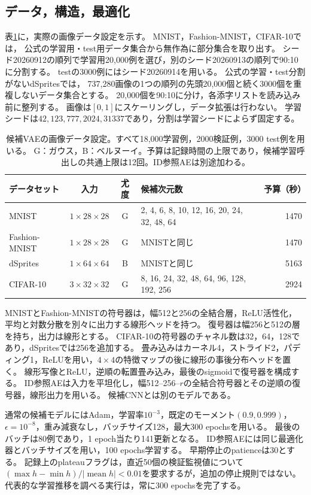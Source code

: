 \documentclass[11pt,a4paper]{ltjsarticle}
\begin{document}
\subsection{データ，構造，最適化}
表\ref{tab:data}に，実際の画像データ設定を示す。
MNIST\cite{lecun1998}，Fashion-MNIST\cite{xiao2017fashion}，CIFAR-10\cite{krizhevsky2009learning}では，
公式の学習用・test用データ集合から無作為に部分集合を取り出す。
シード20260912の順列で学習用20,000例を選び，別のシード20260913の順列で90:10に分割する。
testの3000例にはシード20260914を用いる。
公式の学習・test分割がないdSprites\cite{matthey2017dsprites}では，
737,280画像の1つの順列の先頭20,000個と続く3000個を重複しないデータ集合とする。
20,000個を90:10に分け，各添字リストを読み込み前に整列する。
画像は$[0,1]$にスケーリングし，データ拡張は行わない。
学習シードは$42,123,777,2024,31337$であり，分割は学習シードによらず固定する。

\begin{table}[H]
\caption{候補VAEの画像データ設定。すべて18,000学習例，2000検証例，3000 test例を用いる。
G：ガウス，B：ベルヌーイ。予算は記録時間の上限であり，候補学習呼出しの共通上限は12回。ID参照AEは別途加わる。}
\label{tab:data}\small
\begin{tabularx}{\textwidth}{lccXr}\toprule
データセット & 入力 & 尤度 & 候補次元数 & 予算（秒） \\\midrule
MNIST & $1\times28\times28$ & G & 2, 4, 6, 8, 10, 12, 16, 20, 24, 32, 48, 64 & 1470 \\
Fashion-MNIST & $1\times28\times28$ & G & MNISTと同じ & 1470 \\
dSprites & $1\times64\times64$ & B & MNISTと同じ & 5163 \\
CIFAR-10 & $3\times32\times32$ & G & 8, 16, 24, 32, 48, 64, 96, 128, 192, 256 & 2924 \\
\bottomrule\end{tabularx}
\end{table}

MNISTとFashion-MNISTの符号器は，幅512と256の全結合層，ReLU活性化，
平均と対数分散を別々に出力する線形ヘッドを持つ。
復号器は幅256と512の層を持ち，出力は線形とする。
CIFAR-10の符号器のチャネル数は32，64，128であり，dSpritesでは256を追加する。
畳み込みはカーネル4，ストライド2，パディング1，ReLUを用い，$4\times4$の特徴マップの後に線形の事後分布ヘッドを置く。
線形写像とReLU，逆順の転置畳み込み，最後のsigmoidで復号器を構成する。
ID参照AEは入力を平坦化し，幅512--256--$r$の全結合符号器とその逆順の復号器，線形出力を用いる。
候補CNNとは別のモデルである。

通常の候補モデルにはAdam，学習率$10^{-3}$，既定のモーメント$(0.9,0.999)$，
$\epsilon=10^{-8}$，重み減衰なし，バッチサイズ128，最大300 epochsを用いる。
最後のバッチは80例であり，1 epoch当たり141更新となる。
ID参照AEには同じ最適化器とバッチサイズを用い，100 epochs学習する。
早期停止のpatienceは30とする。
記録上のplateauフラグは，直近50個の検証監視値について
$(\max h-\min h)/|\operatorname{mean}h|<0.01$を要求するが，追加の停止規則ではない。
代表的な学習推移を調べる実行は，常に300 epochsを完了する。
\end{document}
